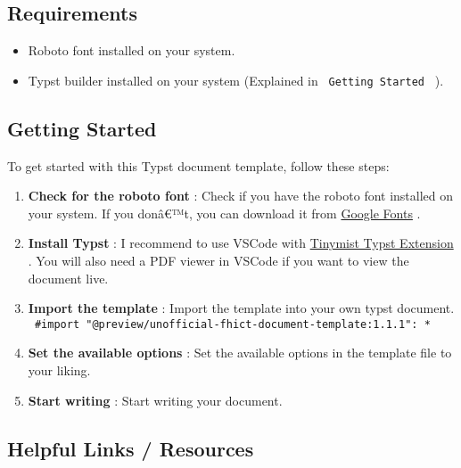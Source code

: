 \subsection{Requirements}\label{requirements}

\begin{itemize}
\tightlist
\item
  Roboto font installed on your system.
\item
  Typst builder installed on your system (Explained in
  \texttt{\ Getting\ Started\ } ).
\end{itemize}

\subsection{Getting Started}\label{getting-started}

To get started with this Typst document template, follow these steps:

\begin{enumerate}
\tightlist
\item
  \textbf{Check for the roboto font} : Check if you have the roboto font
  installed on your system. If you donâ€™t, you can download it from
  \href{https://fonts.google.com/specimen/Roboto}{Google Fonts} .
\item
  \textbf{Install Typst} : I recommend to use VSCode with
  \href{https://marketplace.visualstudio.com/items?itemName=myriad-dreamin.tinymist}{Tinymist
  Typst Extension} . You will also need a PDF viewer in VSCode if you
  want to view the document live.
\item
  \textbf{Import the template} : Import the template into your own typst
  document.
  \texttt{\ \#import\ "@preview/unofficial-fhict-document-template:1.1.1":\ *\ }
\item
  \textbf{Set the available options} : Set the available options in the
  template file to your liking.
\item
  \textbf{Start writing} : Start writing your document.
\end{enumerate}

\subsection{Helpful Links / Resources}\label{helpful-links-resources}

